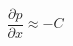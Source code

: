 \documentclass[preview,border=2pt]{standalone}
\begin{document}
\[
\frac{\partial p}{\partial x} \approx -C
\]
\end{document}
